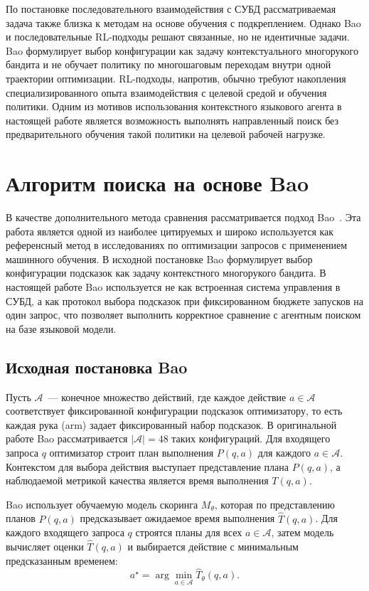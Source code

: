 По постановке последовательного взаимодействия с СУБД рассматриваемая задача также близка к методам на основе обучения с подкреплением. Однако Bao и последовательные RL-подходы решают связанные, но не идентичные задачи. Bao формулирует выбор конфигурации как задачу контекстуального многорукого бандита и не обучает политику по многошаговым переходам внутри одной траектории оптимизации. RL-подходы, напротив, обычно требуют накопления специализированного опыта взаимодействия с целевой средой и обучения политики. Одним из мотивов использования контекстного языкового агента в настоящей работе является возможность выполнять направленный поиск без предварительного обучения такой политики на целевой рабочей нагрузке.

\section{Алгоритм поиска на основе Bao}\label{sec:bao}

В качестве дополнительного метода сравнения рассматривается подход Bao~\cite{10.1145/3448016.3452838}. Эта работа является одной из наиболее цитируемых и широко используется как референсный метод в исследованиях по оптимизации запросов с применением машинного обучения. В исходной постановке Bao формулирует выбор конфигурации подсказок как задачу контекстного многорукого бандита. В настоящей работе Bao используется не как встроенная система управления в СУБД, а как протокол выбора подсказок при фиксированном бюджете запусков на один запрос, что позволяет выполнить корректное сравнение с агентным поиском на базе языковой модели.

\subsection{Исходная постановка Bao}\label{subsec:bao_original}
Пусть $\mathcal{A}$~--- конечное множество действий, где каждое действие $a\in\mathcal{A}$ соответствует фиксированной конфигурации подсказок оптимизатору, то есть каждая рука (arm) задает фиксированный набор подсказок. В оригинальной работе Bao рассматривается $|\mathcal{A}|=48$ таких конфигураций. Для входящего запроса $q$ оптимизатор строит план выполнения $P(q,a)$ для каждого $a\in\mathcal{A}$. Контекстом для выбора действия выступает представление плана $P(q,a)$, а наблюдаемой метрикой качества является время выполнения $T(q,a)$.

Bao использует обучаемую модель скоринга $M_\theta$, которая по представлению планов $P(q,a)$ предсказывает ожидаемое время выполнения $\widehat{T}(q,a)$. Для каждого входящего запроса $q$ строятся планы для всех $a\in\mathcal{A}$, затем модель вычисляет оценки $\widehat{T}(q,a)$ и выбирается действие с минимальным предсказанным временем:
\begin{equation}
\label{eq:bao_choice}
a^\star = \arg\min_{a \in \mathcal{A}} \widehat{T}_{\theta}(q,a).
\end{equation}

